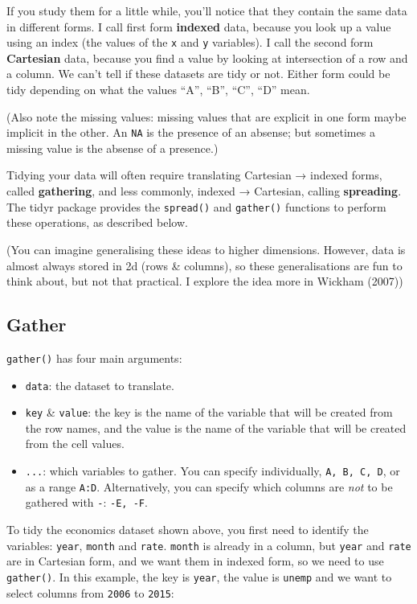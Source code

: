 If you study them for a little while, you'll notice that they contain
the same data in different forms. I call first form \textbf{indexed}
data, because you look up a value using an index (the values of the
\texttt{x} and \texttt{y} variables). I call the second form
\textbf{Cartesian} data, because you find a value by looking at
intersection of a row and a column. We can't tell if these datasets are
tidy or not. Either form could be tidy depending on what the values
``A'', ``B'', ``C'', ``D'' mean.

(Also note the missing values: missing values that are explicit in one
form maybe implicit in the other. An \texttt{NA} is the presence of an
absense; but sometimes a missing value is the absense of a presence.)

Tidying your data will often require translating Cartesian → indexed
forms, called \textbf{gathering}, and less commonly, indexed →
Cartesian, calling \textbf{spreading}. The tidyr package provides the
\texttt{spread()} and \texttt{gather()} functions to perform these
operations, as described below.

(You can imagine generalising these ideas to higher dimensions. However,
data is almost always stored in 2d (rows \& columns), so these
generalisations are fun to think about, but not that practical. I
explore the idea more in Wickham (2007))

\subsection{Gather}

\texttt{gather()} has four main arguments: 

\begin{itemize}
\item
  \texttt{data}: the dataset to translate.
\item
  \texttt{key} \& \texttt{value}: the key is the name of the variable
  that will be created from the row names, and the value is the name of
  the variable that will be created from the cell values.
\item
  \texttt{...}: which variables to gather. You can specify individually,
  \texttt{A,\ B,\ C,\ D}, or as a range \texttt{A:D}. Alternatively, you
  can specify which columns are \emph{not} to be gathered with
  \texttt{-}: \texttt{-E,\ -F}.
\end{itemize}

To tidy the economics dataset shown above, you first need to identify
the variables: \texttt{year}, \texttt{month} and \texttt{rate}.
\texttt{month} is already in a column, but \texttt{year} and
\texttt{rate} are in Cartesian form, and we want them in indexed form,
so we need to use \texttt{gather()}. In this example, the key is
\texttt{year}, the value is \texttt{unemp} and we want to select columns
from \texttt{2006} to \texttt{2015}:

